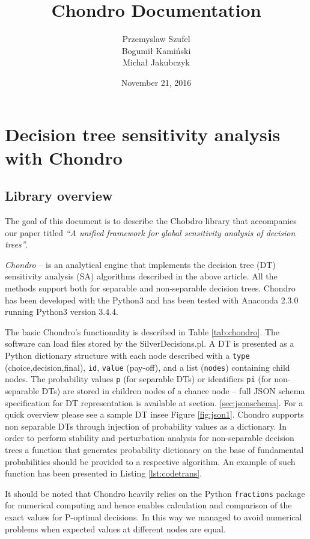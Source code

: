 \documentclass[a4paper,10pt,english]{sphinxmanual}
\title{Chondro Documentation}
\date{November 21, 2016}
\author{Przemyslaw Szufel \\ Bogumi{\l} Kami\'{n}ski \\ Micha{\l} Jakubczyk }
\begin{document}
	\lstset{language=Python}
	\maketitle

	
\chapter{Decision tree sensitivity analysis with Chondro}

\section{Library overview}
	The goal of this document is to describe the Chobdro library that accompanies our paper titled \emph{``A unified framework for global sensitivity analysis of decision trees''}.

	\emph{Chondro} -- is an analytical engine that implements the decision tree (DT) sensitivity analysis (SA) algorithms described in the above article. All the methods support both for separable and non-separable decision trees. Chondro has been developed with the Python3 and has been tested with Anaconda 2.3.0 running Python3 version 3.4.4. 
	
	The basic Chondro's functionality is described in Table \ref{tab:chondro}. The software can load files stored by the \mbox{SilverDecisions.pl}. A DT is presented as a Python dictionary structure with each node described with a \texttt{type} (choice,decision,final), \texttt{id}, \texttt{value} (pay-off), and a list (\texttt{nodes}) containing child nodes. The probability values \texttt{p} (for separable DTs) or identifiers \texttt{pi} (for non-separable DTs)  are stored in children nodes of a chance node -- full JSON schema specification for DT representation is available at section.  \ref{sec:jsonschema}. For a quick overview please see a sample DT insee Figure \ref{fig:json1}.
	Chondro supports non separable DTs through  injection of probability values as a dictionary. In order to perform stability and perturbation analysis for non-separable decision trees a function that generates probability dictionary on the base of fundamental probabilities should be provided to a respective algorithm. An example of such function has been presented in Listing \ref{lst:codetrans}.
	
	It should be noted that Chondro heavily relies on the Python \texttt{fractions} package for numerical computing and hence enables calculation and comparison of the exact values for P-optimal decisions. In this way we managed to avoid numerical problems when expected values at different nodes are equal.	
	
\end{document}
